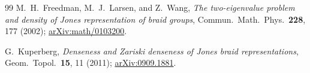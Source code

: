 \documentclass[aps,pra,twocolumn,superscriptaddress,longbibliography,floatfix,nofootinbib]{revtex4-2}
\begin{document}
\begin{thebibliography}{99}
M.~H.~Freedman, M.~J.~Larsen, and Z.~Wang,
\emph{The two-eigenvalue problem and density of Jones representation of braid
groups},
Commun.\ Math.\ Phys.\ \textbf{228}, 177 (2002);
\href{https://arxiv.org/abs/math/0103200}{arXiv:math/0103200}.

G.~Kuperberg,
\emph{Denseness and Zariski denseness of Jones braid representations},
Geom.\ Topol.\ \textbf{15}, 11 (2011);
\href{https://arxiv.org/abs/0909.1881}{arXiv:0909.1881}.

\end{thebibliography}
\end{document}
